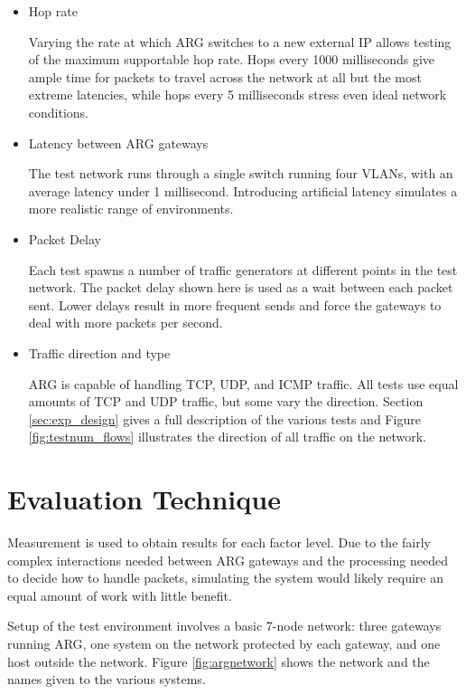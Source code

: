 \begin{itemize}
\item Hop rate
	\par Varying the rate at which \ac{ARG} switches to a new external \ac{IP} allows testing of the maximum supportable hop rate. Hops every 1000 milliseconds give ample time for packets to travel across the network at all but the most extreme latencies, while hops every 5 milliseconds stress even ideal network conditions.

\item Latency between \ac{ARG} gateways
	\par The test network runs through a single switch running four \acp{VLAN}, with an average latency under 1 millisecond. Introducing artificial latency simulates a more realistic range of environments.

\item Packet Delay
	\par Each test spawns a number of traffic generators at different points in the test network. The packet delay shown here is used as a wait between each packet sent. Lower delays result in more frequent sends and force the gateways to deal with more packets per second.

\item Traffic direction and type
	\par \ac{ARG} is capable of handling \ac{TCP}, \ac{UDP}, and \ac{ICMP} traffic. All tests use equal amounts of \ac{TCP} and \ac{UDP} traffic, but some vary the direction. Section \ref{sec:exp_design} gives a full description of the various tests and Figure \ref{fig:testnum_flows} illustrates the direction of all traffic on the network.
\end{itemize}

\section{Evaluation Technique}
\label{sec:eval_technique}
\par Measurement is used to obtain results for each factor level. Due to the fairly complex interactions needed between \ac{ARG} gateways and the processing needed to decide how to handle packets, simulating the system would likely require an equal amount of work with little benefit.

\par Setup of the test environment involves a basic 7-node network: three gateways running \ac{ARG}, one system on the network protected by each gateway, and one host outside the network. Figure \ref{fig:argnetwork} shows the network and the names given to the various systems.

